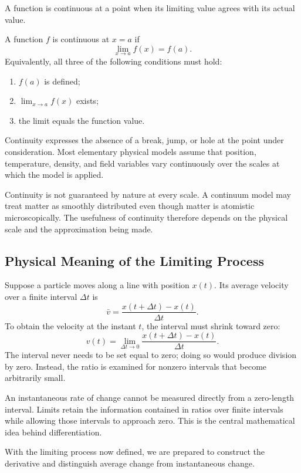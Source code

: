 A function is continuous at a point when its limiting value agrees with its actual value.

\begin{bookdefinition}
A function \(f\) is continuous at \(x=a\) if
\[
\lim_{x\to a}f(x)=f(a).
\]
Equivalently, all three of the following conditions must hold:
\begin{enumerate}
\item \(f(a)\) is defined;
\item \(\lim_{x\to a}f(x)\) exists;
\item the limit equals the function value.
\end{enumerate}
\end{bookdefinition}

Continuity expresses the absence of a break, jump, or hole at the point under consideration. Most elementary physical models assume that position, temperature, density, and field variables vary continuously over the scales at which the model is applied.

\begin{bookremark}
Continuity is not guaranteed by nature at every scale. A continuum model may treat matter as smoothly distributed even though matter is atomistic microscopically. The usefulness of continuity therefore depends on the physical scale and the approximation being made.
\end{bookremark}

\subsection{Physical Meaning of the Limiting Process}

Suppose a particle moves along a line with position \(x(t)\). Its average velocity over a finite interval \(\Delta t\) is
\[
\bar v
=
\frac{x(t+\Delta t)-x(t)}{\Delta t}.
\]
To obtain the velocity at the instant \(t\), the interval must shrink toward zero:
\[
v(t)
=
\lim_{\Delta t\to0}
\frac{x(t+\Delta t)-x(t)}{\Delta t}.
\]
The interval never needs to be set equal to zero; doing so would produce division by zero. Instead, the ratio is examined for nonzero intervals that become arbitrarily small.

\begin{bookinsight}
An instantaneous rate of change cannot be measured directly from a zero-length interval. Limits retain the information contained in ratios over finite intervals while allowing those intervals to approach zero. This is the central mathematical idea behind differentiation.
\end{bookinsight}

With the limiting process now defined, we are prepared to construct the derivative and distinguish average change from instantaneous change.

